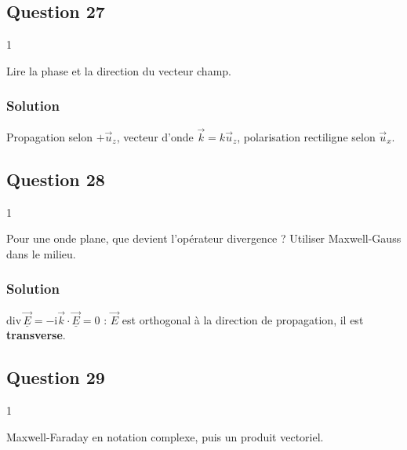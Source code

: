 \documentclass[11pt,a4paper]{article}
\begin{document}
\hypertarget{question-27}{%
\subsection{Question 27}\label{question-27}}

\begin{indication}{1}

Lire la phase et la direction du vecteur champ.

\end{indication}

\hypertarget{solution-26}{%
\subsubsection{Solution}\label{solution-26}}

Propagation selon \(+\vec u_z\), vecteur d'onde \(\vec k=k\vec u_z\), polarisation rectiligne selon \(\vec u_x\).

\hypertarget{question-28}{%
\subsection{Question 28}\label{question-28}}

\begin{indication}{1}

Pour une onde plane, que devient l'opérateur divergence ? Utiliser Maxwell-Gauss dans le milieu.

\end{indication}

\hypertarget{solution-27}{%
\subsubsection{Solution}\label{solution-27}}

\(\mathrm{div}\,\underline{\vec E}=-\mathrm{i}\vec k\cdot\underline{\vec E}=0\) : \(\vec E\) est orthogonal à la direction de propagation, il est \textbf{transverse}.

\hypertarget{question-29}{%
\subsection{Question 29}\label{question-29}}

\begin{indication}{1}

Maxwell-Faraday en notation complexe, puis un produit vectoriel.

\end{indication}
\end{document}
